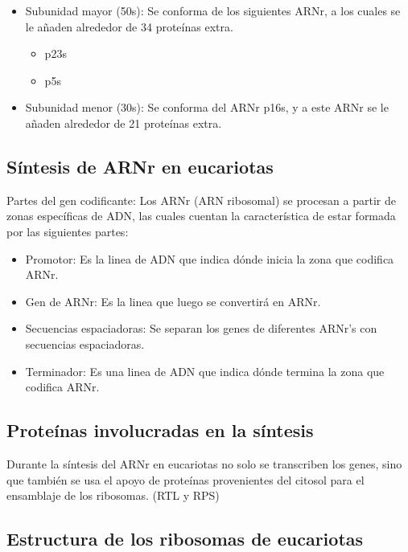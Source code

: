 \begin{itemize}
    \item Subunidad mayor (50s): Se conforma de los siguientes ARNr, a los cuales se le añaden alrededor de 34 proteínas extra.
        \begin{itemize}
            \item p23s
            \item p5s
        \end{itemize}
    
    \item Subunidad menor (30s): Se conforma del ARNr p16s, y a este ARNr se le añaden alrededor de 21 proteínas extra. 
\end{itemize}

\subsection{Síntesis de ARNr en eucariotas}

Partes del gen codificante: Los ARNr (ARN ribosomal) se procesan a partir de zonas específicas de ADN, las cuales cuentan la característica de estar formada por las siguientes partes:

\begin{itemize}
    \item Promotor: Es la linea de ADN que indica dónde inicia la zona que codifica ARNr.
    \item Gen de ARNr: Es la linea que luego se convertirá en ARNr.
    \item Secuencias espaciadoras: Se separan los genes de diferentes ARNr's con secuencias espaciadoras.
    \item Terminador: Es una linea de ADN que indica dónde termina la zona que codifica ARNr.
\end{itemize}

\subsection{Proteínas involucradas en la síntesis}

Durante la síntesis del ARNr en eucariotas no solo se transcriben los genes, sino que también se usa el apoyo de proteínas provenientes del citosol para el ensamblaje de los ribosomas. (RTL y RPS)

\subsection{Estructura de los ribosomas de eucariotas}

